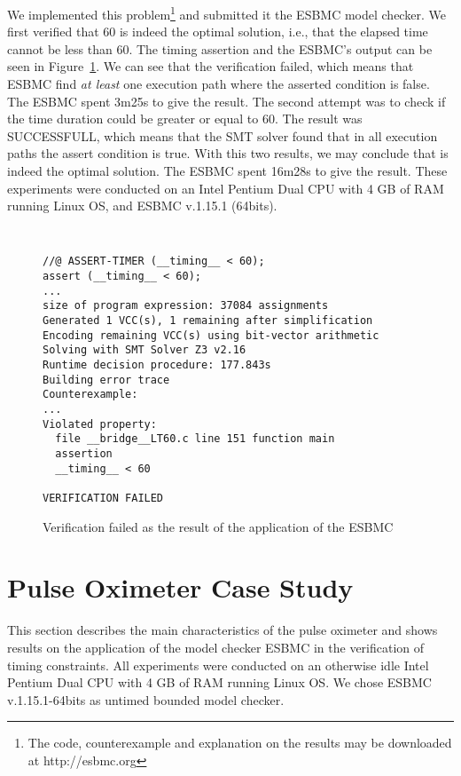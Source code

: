 \documentclass{llncs}
\begin{document}
We implemented this problem\footnote{The code, counterexample and explanation on the results may be downloaded at 
http://esbmc.org} and submitted it the ESBMC model checker. 
We first verified that 60 is indeed the optimal solution, i.e., that
the elapsed time cannot be less than 60. 
The timing assertion and the ESBMC's output can be seen in Figure~\ref{code:toy_result_less}.
We can see that the verification failed, which means that ESBMC find 
\emph{at least} one execution path where the asserted condition is false.
The ESBMC spent 3m25s to give the result.
The second attempt was to check if the time duration could be greater or equal to 60.
The result was SUCCESSFULL, which means that the SMT solver found that in all execution paths 
the assert condition is true.
With this two results, we may conclude that   is indeed the optimal solution.
The ESBMC spent 16m28s to give the result.
These experiments were conducted on an Intel Pentium Dual CPU with 4 GB of RAM running Linux
OS, and ESBMC v.1.15.1 (64bits).


\begin{figure}[!htb]
{\scriptsize
{\tt
\begin{minipage}{\textwidth}
\begin{verbatim}
//@ ASSERT-TIMER (__timing__ < 60);
assert (__timing__ < 60);
...
size of program expression: 37084 assignments
Generated 1 VCC(s), 1 remaining after simplification
Encoding remaining VCC(s) using bit-vector arithmetic
Solving with SMT Solver Z3 v2.16
Runtime decision procedure: 177.843s
Building error trace
Counterexample:
...
Violated property:
  file __bridge__LT60.c line 151 function main
  assertion
  __timing__ < 60

VERIFICATION FAILED
\end{verbatim}
\end{minipage}
}
}
\caption{Verification failed as the result of the application of the ESBMC}
\label{code:toy_result_less}
\end{figure}



\section{Pulse Oximeter Case Study}

This section describes the main characteristics of the pulse oximeter and shows results on the application of the
model checker ESBMC in the verification of timing constraints.
All experiments were conducted on an otherwise idle Intel Pentium Dual CPU with 4 GB of RAM running Linux
OS. We chose ESBMC v.1.15.1-64bits as untimed bounded model checker.
\end{document}
